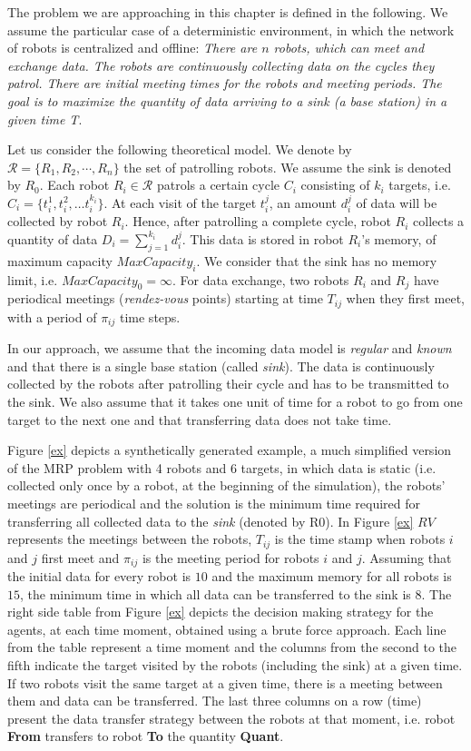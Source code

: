 The problem we are approaching in this chapter is defined in the following. We assume the particular case of a deterministic environment, in which the network of robots is centralized and offline:  \emph{There are $n$ robots, which can meet and exchange data. The robots are continuously collecting data on the cycles they patrol. There are initial meeting times for the robots and meeting periods. The goal is to maximize the quantity of data arriving to a sink (a base station) in a given time T}.

Let us consider the following theoretical model.  We denote by $\mathcal{R}=\{R_1, R_2, \cdots, R_n\}$ the set of patrolling robots. We assume the sink is denoted by $R_0$. Each robot $R_i \in \mathcal{R}$ patrols a certain cycle $C_i$ consisting of $k_i$ targets, i.e. $C_i=\{t_i^{1}, t_i^{2}, \dots t_i^{k_i}\}$. At each visit of the target $t_i^{j}$, an amount $d_i^{j}$ of data  will be collected by robot $R_i$. Hence, after patrolling a complete cycle, robot $R_i$ collects a quantity of data  $D_i=\displaystyle \sum_{j=1}^{k_i}{d_i^{j}}$. This data is stored in robot $R_i$'s memory, of maximum capacity $\mathit{MaxCapacity_i}$.  We consider that the sink has no memory limit, i.e. $MaxCapacity_0=\infty$. For data exchange, two robots $R_i$ and $R_j$ have periodical meetings (\emph{rendez-vous} points) starting at time  $T_{ij}$ when they first meet, with a period of $\pi_{ij}$ time steps.   

In our approach, we assume that the incoming data model is \emph{regular} and \emph{known} and that there is a single base station (called {\em sink}). The data is continuously collected by the robots after patrolling their cycle and has to be transmitted to the sink. We also assume that it takes one unit of time for a robot to go from one target to the next one and that transferring data does not take time.

Figure \ref{ex} depicts a synthetically generated example, a much simplified version of the MRP problem with 4 robots and 6 targets, in which data is static (i.e. collected only once by a robot, at the beginning of the simulation), the robots' meetings are periodical and the solution is the minimum time required for transferring all collected data to the \emph{sink} (denoted by R0). In Figure \ref{ex} $RV$ represents the meetings between the robots, $T_{ij}$ is the time stamp when robots $i$ and $j$ first meet and $\pi_{ij}$ is the meeting period for robots $i$ and $j$. Assuming that the initial data for every robot is $10$ and the maximum memory for all robots is $15$, the minimum time in which all data can be transferred to the sink is $8$. The right side table from Figure \ref{ex} depicts the decision making strategy for the agents, at each time moment, obtained using a brute force approach. Each line from the table represent a time moment and the columns from the second to the fifth indicate the target visited by the robots (including the sink) at a given time.  If two robots visit the same target at a given time, there is a meeting between them and data can be transferred. The last three columns on a row (time) present the data transfer strategy between the robots at that moment, i.e. robot \textbf{From} transfers to robot \textbf{To} the quantity \textbf{Quant}. 

